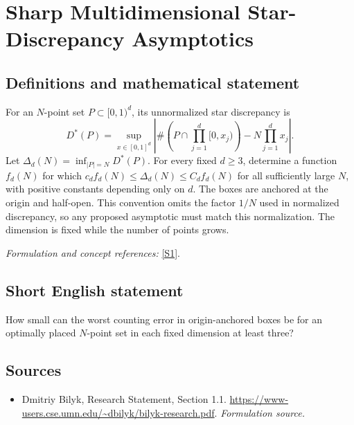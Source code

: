 \documentclass[11pt]{article}
\begin{document}
\section*{\texorpdfstring{Sharp Multidimensional Star-Discrepancy Asymptotics}{Sharp Multidimensional Star-Discrepancy Asymptotics}}\label{30002415}
\subsection{Definitions and mathematical statement}
For an $N$-point set $P\subset[0,1)^d$, its unnormalized star discrepancy is
\[
 D^*(P)=\sup_{x\in[0,1]^d}
 \left|\#\left(P\cap\prod_{j=1}^d[0,x_j)\right)-N\prod_{j=1}^dx_j\right|.
\]
Let $\Delta_d(N)=\inf_{|P|=N}D^*(P)$. For every fixed $d\ge3$, determine a function $f_d(N)$ for which $c_df_d(N)\le\Delta_d(N)\le C_df_d(N)$ for all sufficiently large $N$, with positive constants depending only on $d$. The boxes are anchored at the origin and half-open. This convention omits the factor $1/N$ used in normalized discrepancy, so any proposed asymptotic must match this normalization. The dimension is fixed while the number of points grows.
\par\smallskip\textit{Formulation and concept references:} \href{https://www-users.cse.umn.edu/~dbilyk/bilyk-research.pdf}{[S1]}.

\subsection{Short English statement}
How small can the worst counting error in origin-anchored boxes be for an optimally placed $N$-point set in each fixed dimension at least three?
\subsection{Sources}
\begin{itemize}
\item[S1]Dmitriy Bilyk, Research Statement, Section 1.1.
\url{https://www-users.cse.umn.edu/~dbilyk/bilyk-research.pdf}.
\textit{Formulation source.}
\end{itemize}
\end{document}
